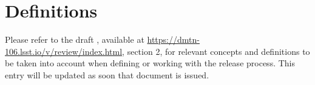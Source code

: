 \section{Definitions} \label{sec:defs}

Please refer to the draft , available at \url{https://dmtn-106.lsst.io/v/review/index.html}, section 2, 
for relevant concepts and definitions to be taken into account when defining or working with the release process.
This entry will be updated as soon that document is issued.

